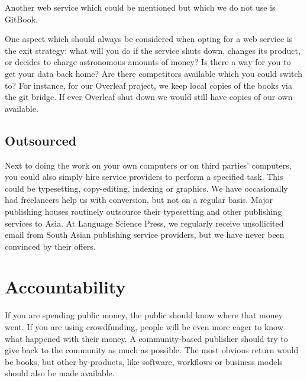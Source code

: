 \documentclass[guidelines,nonflat,modfonts] {langsci/langscibook}
\begin{document}
Another web service which could be mentioned but which we do not use is GitBook. 

One aspect which should always be considered when opting for a web service is the exit strategy: what will you do if the service shuts down, changes its product, or decides to charge astronomous amounts of money? Is there a way for you to get your data back home? Are there competitors available which you could switch to? For instance, for our Overleaf project, we keep local copies of the books via the git bridge. If ever Overleaf shut down we would still have copies of our own available. 

\subsection{Outsourced}
Next to doing the work on your own computers or on third parties' computers, you could also simply hire service providers to perform a specified task. This could be typesetting, copy-editing, indexing or graphics. We have occasionally had freelancers help us with conversion, but not on a regular basis. Major publishing houses routinely outsource their typesetting and other publishing services to Asia. At Language Science Press, we regularly receive unsollicited email from South Asian publishing service providers, but we have never been convinced by their offers. 
            
            
\section{Accountability}\label{sec:accountability}
If you are spending public money, the public should know where that money went. If you are using crowdfunding, people will be even more eager to know what happened with their money. A community-based publisher should try to give back to the community as much as possible. The most obvious return would be books, but other by-products, like software, workflows or business models should also be made available. 
\end{document}
